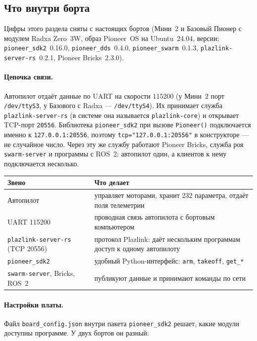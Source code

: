 \subsection{Что внутри борта}
\label{sec:board-inside}

Цифры этого раздела сняты с настоящих бортов (Мини~2 и Базовый Пионер с модулем Radxa Zero~3W, образ Pioneer~OS на Ubuntu~24.04, версии: \texttt{pioneer\_sdk2}~0.16.0, \texttt{pioneer\_dds}~0.4.0, \texttt{pioneer\_swarm}~0.1.3, \texttt{plazlink-server-rs}~0.2.1, Pioneer Bricks~2.3.0).

\paragraph{Цепочка связи.} Автопилот отдаёт данные по UART на скорости 115200 (у Мини~2 порт \texttt{/dev/ttyS3}, у Базового с Radxa --- \texttt{/dev/ttyS4}). Их принимает служба \texttt{plazlink-server-rs} (в системе она называется \texttt{plazlink-core}) и открывает TCP-порт \texttt{20556}. Библиотека \texttt{pioneer\_sdk2} при вызове \verb|Pioneer()| подключается именно к \texttt{127.0.0.1:20556}, поэтому \verb|tcp="127.0.0.1:20556"| в конструкторе --- не случайное число. Через эту же службу работают Pioneer Bricks, служба роя \texttt{swarm-server} и программы с ROS~2: автопилот один, а клиентов к нему подключается несколько.

\begin{center}
\small
\begin{tabularx}{\linewidth}{@{}l >{\raggedright\arraybackslash}X@{}}
\toprule
\textbf{Звено} & \textbf{Что делает} \\
\midrule
Автопилот & управляет моторами, хранит 232 параметра, отдаёт поля телеметрии \\
UART 115200 & проводная связь автопилота с бортовым компьютером \\
\texttt{plazlink-server-rs} (TCP 20556) & протокол Plazlink: даёт нескольким программам доступ к одному автопилоту \\
\texttt{pioneer\_sdk2} & удобный Python-интерфейс: \verb|arm|, \verb|takeoff|, \verb|get_*| \\
\texttt{swarm-server}, Bricks, ROS~2 & публикуют данные и принимают команды по сети \\
\bottomrule
\end{tabularx}
\end{center}

\paragraph{Настройки платы.} Файл \texttt{board\_config.json} внутри пакета \texttt{pioneer\_sdk2} решает, какие модули доступны программе. У двух бортов он разный:

